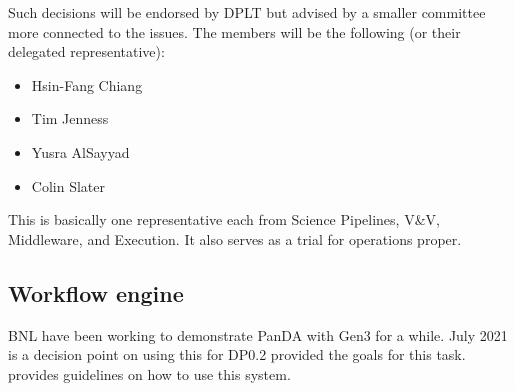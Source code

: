 Such decisions will be endorsed by DPLT but advised by a smaller committee more connected to the issues.
The members will be the following (or their delegated representative):

\begin{itemize}
\item Hsin-Fang Chiang
\item Tim Jenness
\item Yusra AlSayyad
\item Colin Slater
\end{itemize}

This is basically  one representative each from Science Pipelines, V\&V, Middleware, and Execution.
It also serves as a trial for operations proper.

\subsection {Workflow engine}
BNL have been working to demonstrate PanDA with Gen3 for a while. July 2021 is a decision point on using this for DP0.2
 provided the goals for this task.  provides guidelines on how to use this system.


